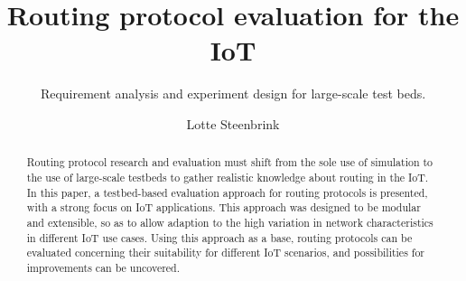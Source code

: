 \documentclass{acm_proc_article-sp}
\begin{document}
\title{Routing protocol evaluation for the IoT}
\subtitle{Requirement analysis and experiment design for large-scale test beds.}

\author{
\alignauthor
Lotte Steenbrink
}

\maketitle
\begin{abstract}
Routing protocol research and evaluation must shift from the sole use of simulation to the use of large-scale testbeds to gather realistic knowledge about routing in the IoT.
In this paper, a testbed-based evaluation approach for routing protocols is presented, with a strong focus on IoT applications. This approach was designed to be modular and extensible, so as to allow adaption to the high variation in network characteristics in different IoT use cases. Using this approach as a base, routing protocols can be evaluated concerning their suitability for different IoT scenarios, and possibilities for improvements can be uncovered.
\end{abstract}

\end{document}
